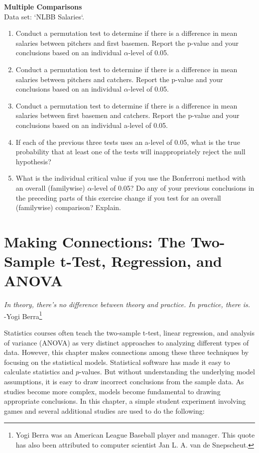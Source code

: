 \documentclass[
]{report}
\theoremstyle{definition}
\theoremstyle{definition}
\theoremstyle{definition}
\theoremstyle{definition}
\theoremstyle{remark}
\begin{document}
\begin{list}{E.}{ \setlength{\itemsep}{0.5em}}
  
  \item \textbf{Multiple Comparisons} \\
  Data set: `NLBB Salaries`. 
  \begin{enumerate}
    \setcounter{enumi}{0}  
    \item Conduct a permutation test to determine if there is a difference in mean salaries between
pitchers and first basemen. Report the p-value and your conclusions based on an individual
$\alpha$-level of 0.05.
    \item Conduct a permutation test to determine if there is a difference in mean salaries between
pitchers and catchers. Report the p-value and your conclusions based on an individual
$\alpha$-level of 0.05.
    \item Conduct a permutation test to determine if there is a difference in mean salaries between first
basemen and catchers. Report the p-value and your conclusions based on an individual a-level
of 0.05.
    \item If each of the previous three tests uses an a-level of 0.05, what is the true probability that at least
one of the tests will inappropriately reject the null hypothesis?
    \item What is the individual critical value if you use the Bonferroni method with an overall (familywise)
$\alpha$-level of 0.05? Do any of your previous conclusions in the preceding parts of this exercise
change if you test for an overall (familywise) comparison? Explain.
  \end{enumerate}
  
  
  
  
\end{list}

\hypertarget{making-connections-the-two-sample-t-test-regression-and-anova}{%
\chapter{Making Connections: The Two-Sample t-Test, Regression, and ANOVA}\label{making-connections-the-two-sample-t-test-regression-and-anova}}

{ \emph{In theory, there's no difference between theory and practice. In practice, there is.}}\\
{ -Yogi Berra\footnote{Yogi Berra was an American League Baseball player and manager. This quote has also been attributed to computer scientist Jan L. A. van de Snepscheut.}
}

Statistics courses often teach the two-sample t-test, linear regression, and analysis of variance (ANOVA) as very distinct approaches to analyzing different types of data. However, this chapter makes connections among these three techniques by focusing on the statistical models. Statistical software has made it easy to calculate statistics and \(p\)-values. But without understanding the underlying model assumptions, it is easy to draw incorrect conclusions from the sample data. As studies become more complex, models become fundamental to drawing appropriate conclusions. In this chapter, a simple student experiment involving games and several additional studies are used to do the following:
\end{document}
